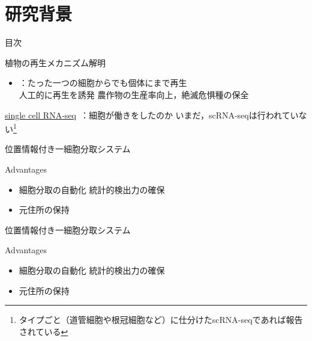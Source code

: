 \section{研究背景}

\begin{frame}[noframenumbering]{目次}
    \tableofcontents[currentsection]
\end{frame}

\begin{frame}{植物の再生メカニズム解明}
    \begin{itemize}
        \item {}：たった一つの細胞からでも個体にまで再生
        \\\ra 人工的に再生を誘発 \Ra 農作物の生産率向上，絶滅危惧種の保全
    \end{itemize}
    \vs
    \uline{single cell RNA-seq}\ \cite{kolodziejczyk2015technology}：細胞が働きをしたのか
    \Ra いまだ，scRNA-seqは行われていない\footnote{タイプごと（道管細胞や根冠細胞など）に仕分けたscRNA-seqであれば報告されている\cite{shahan2022single}}
    \vs
\end{frame}

\begin{frame}{位置情報付き一細胞分取システム}
    \begin{block}{Advantages}
        \begin{itemize}
            \item 細胞分取の自動化 \Ra 統計的検出力の確保
            \item 元住所の保持 \Ra {}
        \end{itemize}
    \end{block}
\end{frame}
\begin{frame}[noframenumbering]{位置情報付き一細胞分取システム}
    \begin{block}{Advantages}
        \begin{itemize}
            \item 細胞分取の自動化 \Ra 統計的検出力の確保
            \item 元住所の保持 \Ra {}
        \end{itemize}
    \end{block}
\end{frame}